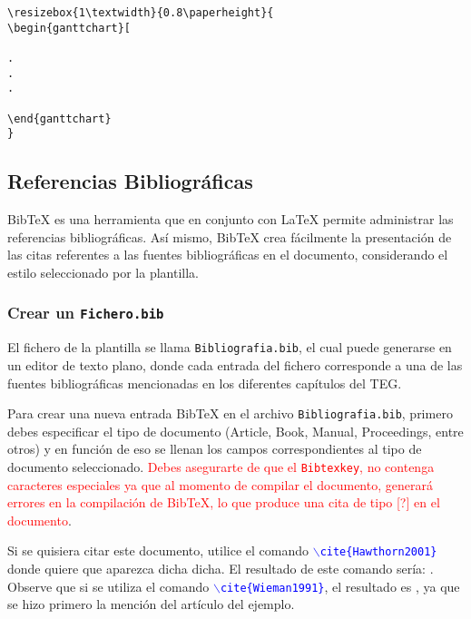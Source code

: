 \begin{verbatim}
\resizebox{1\textwidth}{0.8\paperheight}{
\begin{ganttchart}[

.
.
.

\end{ganttchart}
}
\end{verbatim}


\subsection{Referencias Bibliográficas}

BibTeX es una herramienta que en conjunto con \LaTeX{} permite administrar las referencias bibliográficas. Así mismo, BibTeX crea fácilmente la presentación de las citas referentes a las fuentes bibliográficas en el documento, considerando el estilo seleccionado por la plantilla.

\subsubsection{Crear un \texttt{Fichero.bib}}
\label{Crear un Fichero .bib}

El fichero de la plantilla se llama \texttt{Bibliografia.bib}, el cual puede generarse en un editor de texto plano, donde cada entrada del fichero corresponde a una de las fuentes bibliográficas mencionadas en los diferentes capítulos del TEG.

Para crear una nueva entrada BibTeX en el archivo \texttt{Bibliografia.bib}, primero debes especificar el tipo de documento (Article, Book, Manual, Proceedings, entre otros) y en función de eso se llenan los campos correspondientes al tipo de documento seleccionado. \textcolor{red}{Debes asegurarte de que el \texttt{Bibtexkey}, no contenga caracteres especiales ya que al momento de compilar el documento, generará errores en la compilación de BibTeX, lo que produce una cita de tipo [?] en el documento}.

Si se quisiera citar este documento, utilice el comando \textcolor{blue}{$\backslash$\texttt{cite\{Hawthorn2001\}}} donde quiere que aparezca dicha dicha. El resultado de este comando sería: \cite{Hawthorn2001}. Observe que si se utiliza el comando \textcolor{blue}{$\backslash$\texttt{cite\{Wieman1991\}}}, el resultado es \cite{Wieman1991}, ya que se hizo primero la mención del  artículo del ejemplo.

